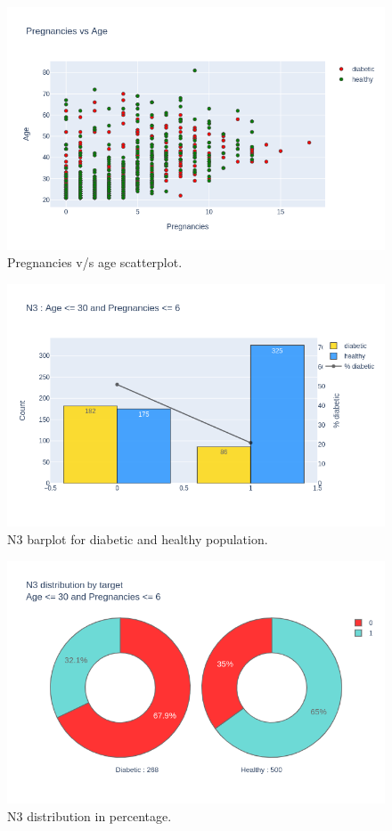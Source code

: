 \documentclass[12pt]{article}
\begin{document}
\begin{figure}[ht]
\centering
\includegraphics[width=1\textwidth]{newplot(17).png}
\caption{\label{fig:27} Pregnancies v/s age scatterplot.}
\end{figure}

\begin{figure}[ht]
\centering
\includegraphics[width=1\textwidth]{newplot(18).png}
\caption{\label{fig:28} N3 barplot for diabetic and healthy population.}
\end{figure}

\begin{figure}[ht]
\centering
\includegraphics[width=1\textwidth]{newplot(19).png}
\caption{\label{fig:29} N3 distribution in percentage.}
\end{figure}
\end{document}
